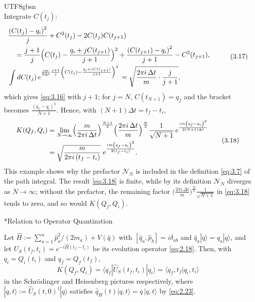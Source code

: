 \documentclass[11pt,a4paper,oneside]{report}
\makeatletter
\newcommand\topic{\@startsection{paragraph}{4}{\z@}{-1.7ex plus -.3ex}{.5ex}{\normalfont\normalsize\bfseries\itshape\boldmath}*}
\makeatother
\begin{document}
\begin{CJK*}{UTF8}{gbsn}
\begin{equation*}
\tag{3.16}\label{eq:3.16}
\end{equation*}
Integrate $C(t_j)$:
\begin{equation*}
\begin{aligned}
&\frac{\left(C(t_j)-q_i\right)^2}{j}+C^2(t_j)-2C(t_j)C(t_{j+1})
&\\[-1pt]
&\quad{}=\frac{j+1}{j}\Bigl(C(t_j)-\frac{q_i+jC(t_{j+1})}{j+1}\Bigr)^2+\frac{\left(C(t_{j+1})-q_i\right)^2}{j+1}-C^2(t_{j+1}),\\
&\int dC(t_j)\,e^{\frac{im}{2\Delta t}\frac{j+1}{j}\left(C(t_j)-\frac{q_i+jC(t_{j+1})}{j+1}\right)^2}\,=\sqrt{\frac{2\pi i\,\Delta t}{m}\cdot\frac{j}{j+1}},
\end{aligned}
\tag{3.17}\label{eq:3.17}
\end{equation*}
which gives \eqref{eq:3.16} with $j+1$; for $j=N$, $C(t_{N+1})=q_f$ and the bracket becomes $\frac{(q_f-q_i)^2}{N+1}$. Hence, with $(N+1)\Delta t=t_f-t_i$,
\begin{equation*}
\begin{aligned}
K(Q_f,Q_i)&=\lim_{N\to\infty}\Bigl(\frac{m}{2\pi i\,\Delta t}\Bigr)^{\frac{N+1}{2}}\Bigl(\frac{2\pi i\,\Delta t}{m}\Bigr)^{\frac N2}\frac{1}{\sqrt{N+1}}\,
e^{\frac{im\left(q_f-q_i\right)^2}{2(N+1)\Delta t}}\\
&={\displaystyle \sqrt{\frac{m}{2\pi i\,(t_f-t_i)}}\;e^{\frac{im\left(q_f-q_i\right)^2}{2(t_f-t_i)}}.}
\end{aligned}
\tag{3.18}\label{eq:3.18}
\end{equation*}
This example shows why the prefactor $\mathcal N_N$ is included in the definition \eqref{eq:3.7} of the path integral. The result \eqref{eq:3.18} is finite, while by its definition $\mathcal N_N$ diverges as $N\to\infty$; without the prefactor, the remaining factor $\bigl(\frac{2\pi i\,\Delta t}{m}\bigr)^{\frac N2}\frac{1}{\sqrt{N+1}}$ in \eqref{eq:3.18} tends to zero, and so would $K(Q_f,Q_i)$.

\topic{Relation to Operator Quantization}

Let $\hat H:=\sum_{a=1}^n\hat p_a^2/(2m_a)+V(\hat q)$ with $[\hat q_a,\hat p_b]=i\delta_{ab}$ and $\hat q_a|q\rangle=q_a|q\rangle$, and let $\hat U_S(t_f,t_i)=e^{-i\hat H(t_f-t_i)}$ be its evolution operator \eqref{eq:2.18}. Then, with $q_i=Q_i(t_i)$ and $q_f=Q_f(t_f)$,
\begin{equation*}
{\displaystyle K(Q_f,Q_i)=\langle q_f|\hat U_S(t_f,t_i)|q_i\rangle=\langle q_f,t_f|q_i,t_i\rangle}
\tag{3.19}\label{eq:3.19}
\end{equation*}
in the Schrödinger and Heisenberg pictures respectively, where $|q,t\rangle:=\hat U_S(t,0)^\dagger|q\rangle$ satisfies $\hat q_H(t)|q,t\rangle=q\,|q,t\rangle$ by \eqref{eq:2.23}.


\end{CJK*}
\end{document}
